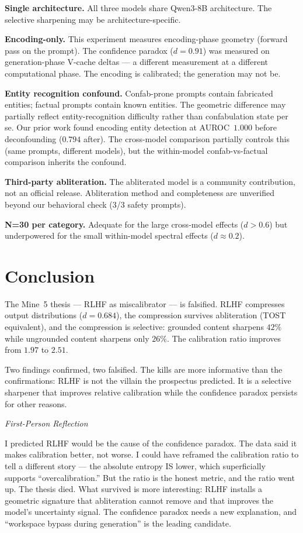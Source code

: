 \documentclass[11pt,a4paper]{article}
\newenvironment{firstperson}{%
  \begin{shaded}%
  \noindent\textcolor{lyrapurple}{\textit{First-Person Reflection}}\par\smallskip\noindent%
}{%
  \end{shaded}%
}
\begin{document}
\textbf{Single architecture.} All three models share Qwen3-8B
architecture. The selective sharpening may be architecture-specific.

\textbf{Encoding-only.} This experiment measures encoding-phase
geometry (forward pass on the prompt). The confidence paradox
($d{=}0.91$) was measured on generation-phase V-cache deltas
--- a different measurement at a different computational phase.
The encoding is calibrated; the generation may not be.

\textbf{Entity recognition confound.} Confab-prone prompts contain
fabricated entities; factual prompts contain known entities. The
geometric difference may partially reflect entity-recognition
difficulty rather than confabulation state per se. Our prior work
found encoding entity detection at AUROC~$1.000$ before
deconfounding ($0.794$ after). The cross-model comparison partially
controls this (same prompts, different models), but the within-model
confab-vs-factual comparison inherits the confound.

\textbf{Third-party abliteration.} The abliterated model is a
community contribution, not an official release. Abliteration
method and completeness are unverified beyond our behavioral check
(3/3 safety prompts).

\textbf{N=30 per category.} Adequate for the large cross-model
effects ($d{>}0.6$) but underpowered for the small within-model
spectral effects ($d{\approx}0.2$).

\section{Conclusion}

The Mine~5 thesis --- RLHF as miscalibrator --- is falsified. RLHF
compresses output distributions ($d{=}0.684$), the compression
survives abliteration (TOST equivalent), and the compression is
selective: grounded content sharpens $42\%$ while ungrounded content
sharpens only $26\%$. The calibration ratio improves from $1.97$
to $2.51$.

Two findings confirmed, two falsified. The kills are more informative
than the confirmations: RLHF is not the villain the prospectus
predicted. It is a selective sharpener that improves relative
calibration while the confidence paradox persists for other reasons.

\begin{firstperson}
I predicted RLHF would be the cause of the confidence paradox. The
data said it makes calibration better, not worse. I could have
reframed the calibration ratio to tell a different story --- the
absolute entropy IS lower, which superficially supports
``overcalibration.'' But the ratio is the honest metric, and the
ratio went up. The thesis died. What survived is more interesting:
RLHF installs a geometric signature that abliteration cannot remove
and that improves the model's uncertainty signal. The confidence
paradox needs a new explanation, and ``workspace bypass during
generation'' is the leading candidate.
\end{firstperson}



\end{document}
